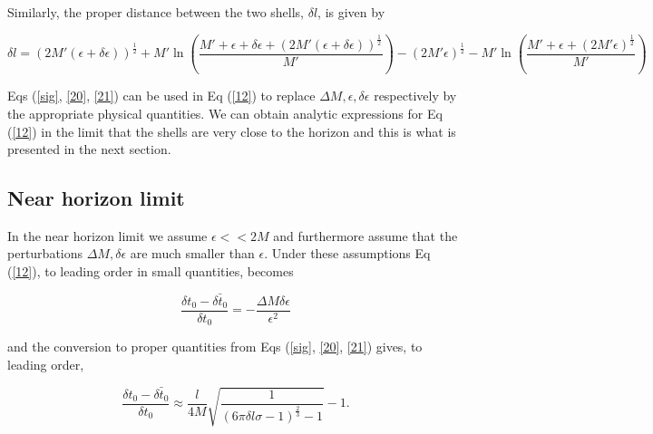 \documentclass[aps,showpacs,twocolumn,floats,prd,superscriptaddress,nofootinbib]{revtex4-1}
\begin{document}
Similarly, the proper distance between the two shells, $\delta l$, is given by

\begin{equation}
	\delta l = (2M'(\epsilon + \delta \epsilon))^{\frac{1}{2}} + M' \ln \left(\frac{M' + \epsilon + \delta \epsilon + (2M'(\epsilon +\delta \epsilon))^{\frac{1}{2}}}{M'} \right) - (2M'\epsilon)^\frac{1}{2} - M' \ln \left( \frac{M' + \epsilon + (2M' \epsilon)^\frac{1}{2}}{M'} \right)	\label{21}
\end{equation}
	
Eqs (\ref{sig}, \ref{20}, \ref{21}) can be used in Eq (\ref{12}) to replace $\Delta M, \epsilon, \delta \epsilon$ respectively by the appropriate physical quantities. We can obtain analytic expressions for Eq (\ref{12}) in the limit that the shells are very close to the horizon and this is what is presented in the next section. 

\subsection{Near horizon limit}

In the near horizon limit we assume $\epsilon<< 2M$ and furthermore assume that the perturbations $\Delta M, \delta \epsilon$ are much smaller than $\epsilon$. Under these assumptions Eq (\ref{12}), to leading order in small quantities, becomes

\begin{equation}
	\frac{\delta t_0 - \bar{\delta t_0}}{\delta t_0} = - \frac{\Delta M \delta \epsilon}{\epsilon^2}
\end{equation}

and the conversion to proper quantities from Eqs (\ref{sig}, \ref{20}, \ref{21}) gives, to leading order, 

\begin{equation}
	\frac{\delta t_0 - \bar{\delta t_0}}{\delta t_0} \approx \frac{l}{4M} \sqrt{\frac{1}{(6 \pi \delta l \sigma - 1)^\frac{2}{3} -1 }} - 1.
\end{equation}

%
%
%
\end{document}
